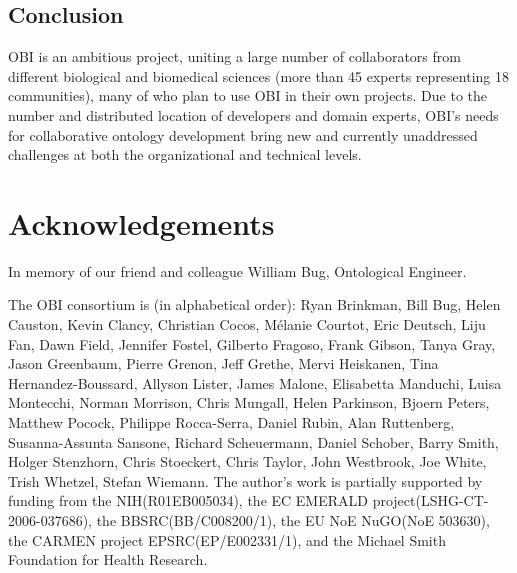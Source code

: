 \documentclass{elsart}       %
\begin{document}
\subsection{Conclusion}
OBI is an ambitious project, uniting a large number of collaborators from different biological and biomedical sciences (more than 45 experts representing 18 communities), many of who plan to use OBI in their own projects.
Due to the number and distributed location of developers and domain experts, OBI’s needs for collaborative ontology development bring new and currently unaddressed challenges at both the organizational and technical levels.



\section{Acknowledgements}

In memory of our friend and colleague William Bug, Ontological Engineer. 

The OBI consortium is (in alphabetical order): Ryan Brinkman, Bill Bug, Helen Causton, Kevin Clancy, Christian Cocos, M\'elanie Courtot, Eric Deutsch, Liju Fan, Dawn Field, Jennifer Fostel, Gilberto Fragoso, Frank Gibson, Tanya Gray, Jason Greenbaum, Pierre Grenon, Jeff Grethe, Mervi Heiskanen, Tina Hernandez-Boussard, Allyson Lister, James Malone, Elisabetta Manduchi, Luisa Montecchi, Norman Morrison, Chris Mungall, Helen Parkinson, Bjoern Peters, Matthew Pocock, Philippe Rocca-Serra, Daniel Rubin, Alan Ruttenberg, Susanna-Assunta Sansone, Richard Scheuermann, Daniel Schober, Barry Smith, Holger Stenzhorn, Chris Stoeckert, Chris Taylor, John Westbrook,  Joe White, Trish Whetzel, Stefan Wiemann. The author’s work is partially supported by funding from the NIH(R01EB005034), the EC EMERALD project(LSHG-CT-2006-037686), the BBSRC(BB/C008200/1), the EU NoE NuGO(NoE 503630), the CARMEN project EPSRC(EP/E002331/1), and the Michael Smith Foundation for Health Research.





\end{document}

